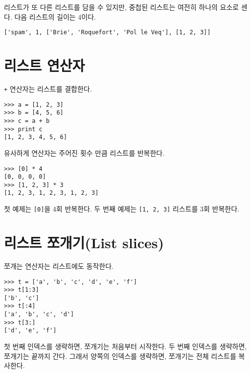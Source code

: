 리스트가 또 다른 리스트를 담을 수 있지만, 중첩된 리스트는 여전히 하나의 요소로 센다. 다음 리스트의 길이는 4이다.


\beforeverb
\begin{verbatim}
['spam', 1, ['Brie', 'Roquefort', 'Pol le Veq'], [1, 2, 3]]
\end{verbatim}
\afterverb

\section{리스트 연산자}

{\tt +} 연산자는 리스트를 결합한다.


\beforeverb
\begin{verbatim}
>>> a = [1, 2, 3]
>>> b = [4, 5, 6]
>>> c = a + b
>>> print c
[1, 2, 3, 4, 5, 6]
\end{verbatim}
\afterverb
%
유사하게 {\tt *} 연산자는 주어진 횟수 만큼 리스트를 반복한다.


\beforeverb
\begin{verbatim}
>>> [0] * 4
[0, 0, 0, 0]
>>> [1, 2, 3] * 3
[1, 2, 3, 1, 2, 3, 1, 2, 3]
\end{verbatim}
\afterverb
%

첫 예제는 {\tt [0]}을 4회 반복한다. 두 번째 예제는 {\tt [1, 2, 3]} 리스트를 3회 반복한다.

\section{리스트 쪼개기(List slices)}


쪼개는 연산자는 리스트에도 동작한다.

\beforeverb
\begin{verbatim}
>>> t = ['a', 'b', 'c', 'd', 'e', 'f']
>>> t[1:3]
['b', 'c']
>>> t[:4]
['a', 'b', 'c', 'd']
>>> t[3:]
['d', 'e', 'f']
\end{verbatim}
\afterverb
%
첫 번째 인덱스를 생략하면, 쪼개기는 처음부터 시작한다. 두 번째 인덱스를 생략하면, 쪼개기는 끝까지 간다.
그래서 양쪽의 인덱스를 생략하면, 쪼개기는 전체 리스트를 복사한다.

